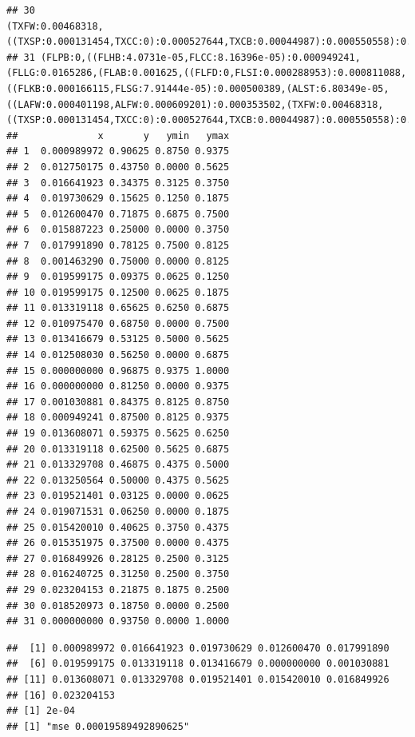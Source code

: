 \documentclass[]{article}
\begin{document}
\begin{verbatim}
## 30                                                                                                                                                                                                                                                                                                                                 (TXFW:0.00468318,((TXSP:0.000131454,TXCC:0):0.000527644,TXCB:0.00044987):0.000550558):0.00263375
## 31 (FLPB:0,((FLHB:4.0731e-05,FLCC:8.16396e-05):0.000949241,(FLLG:0.0165286,(FLAB:0.001625,((FLFD:0,FLSI:0.000288953):0.000811088,((FLKB:0.000166115,FLSG:7.91444e-05):0.000500389,(ALST:6.80349e-05,((LAFW:0.000401198,ALFW:0.000609201):0.000353502,(TXFW:0.00468318,((TXSP:0.000131454,TXCC:0):0.000527644,TXCB:0.00044987):0.000550558):0.00263375):0.000535248):0.0026018):0.000242145):0.00153256):0.00951218):0.00146329):0);
##              x       y   ymin   ymax
## 1  0.000989972 0.90625 0.8750 0.9375
## 2  0.012750175 0.43750 0.0000 0.5625
## 3  0.016641923 0.34375 0.3125 0.3750
## 4  0.019730629 0.15625 0.1250 0.1875
## 5  0.012600470 0.71875 0.6875 0.7500
## 6  0.015887223 0.25000 0.0000 0.3750
## 7  0.017991890 0.78125 0.7500 0.8125
## 8  0.001463290 0.75000 0.0000 0.8125
## 9  0.019599175 0.09375 0.0625 0.1250
## 10 0.019599175 0.12500 0.0625 0.1875
## 11 0.013319118 0.65625 0.6250 0.6875
## 12 0.010975470 0.68750 0.0000 0.7500
## 13 0.013416679 0.53125 0.5000 0.5625
## 14 0.012508030 0.56250 0.0000 0.6875
## 15 0.000000000 0.96875 0.9375 1.0000
## 16 0.000000000 0.81250 0.0000 0.9375
## 17 0.001030881 0.84375 0.8125 0.8750
## 18 0.000949241 0.87500 0.8125 0.9375
## 19 0.013608071 0.59375 0.5625 0.6250
## 20 0.013319118 0.62500 0.5625 0.6875
## 21 0.013329708 0.46875 0.4375 0.5000
## 22 0.013250564 0.50000 0.4375 0.5625
## 23 0.019521401 0.03125 0.0000 0.0625
## 24 0.019071531 0.06250 0.0000 0.1875
## 25 0.015420010 0.40625 0.3750 0.4375
## 26 0.015351975 0.37500 0.0000 0.4375
## 27 0.016849926 0.28125 0.2500 0.3125
## 28 0.016240725 0.31250 0.2500 0.3750
## 29 0.023204153 0.21875 0.1875 0.2500
## 30 0.018520973 0.18750 0.0000 0.2500
## 31 0.000000000 0.93750 0.0000 1.0000
\end{verbatim}

\begin{verbatim}
##  [1] 0.000989972 0.016641923 0.019730629 0.012600470 0.017991890
##  [6] 0.019599175 0.013319118 0.013416679 0.000000000 0.001030881
## [11] 0.013608071 0.013329708 0.019521401 0.015420010 0.016849926
## [16] 0.023204153
## [1] 2e-04
## [1] "mse 0.00019589492890625"
\end{verbatim}
\end{document}
